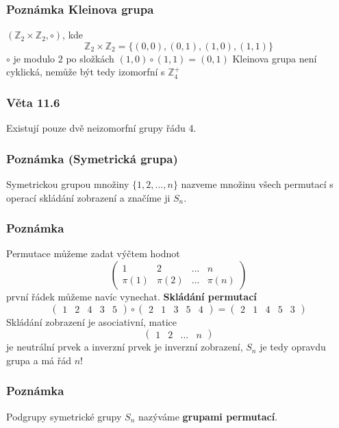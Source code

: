 \documentclass[12pt, letterpaper]{article}
\begin{document}
\subsubsection*{Poznámka Kleinova grupa}
$(\mathbb{Z}_2 \times \mathbb{Z}_2, \circ)$, kde
\[\mathbb{Z}_2 \times \mathbb{Z}_2 = \{(0,0), (0,1), (1,0), (1,1)\}\]
$\circ$ je modulo $2$ po složkách $(1,0) \circ (1,1) = (0,1)$
Kleinova grupa není cyklická, nemůže být tedy izomorfní s $\mathbb{Z}^+_4$

\subsubsection*{Věta 11.6}
Existují pouze dvě neizomorfní grupy řádu 4.

\subsubsection*{Poznámka (Symetrická grupa)}
Symetrickou grupou množiny $\{1,2,...,n\}$
nazveme množinu všech permutací s operací skládání zobrazení a značíme ji $S_n$.

\subsubsection*{Poznámka}
Permutace můžeme zadat výčtem hodnot
\[
\begin{pmatrix}
    1 & 2 & ... & n\\
    \pi(1) & \pi(2) & ... & \pi(n)
\end{pmatrix}
\]
první řádek můžeme navíc vynechat.
\textbf{Skládání permutací} 
\[
    \begin{pmatrix} 1 & 2 & 4 & 3 & 5 \end{pmatrix} \circ
    \begin{pmatrix} 2 & 1 & 3 & 5 & 4 \end{pmatrix} =
    \begin{pmatrix} 2 & 1 & 4 & 5 & 3 \end{pmatrix}
\]
Skládání zobrazení je asociativní, matice \[ \begin{pmatrix} 1 & 2 & ... & n \end{pmatrix} \] je neutrální prvek
 a inverzní prvek je inverzní zobrazení, $S_n$ je tedy opravdu grupa a má řád $n!
 $

\subsubsection*{Poznámka}
Podgrupy symetrické grupy $S_n$ nazýváme \textbf{grupami permutací}.
\end{document}
